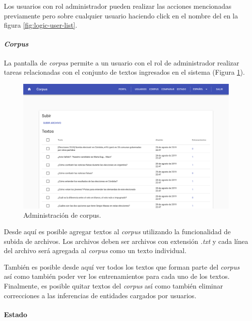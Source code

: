 \documentclass[12pt,a4paper,]{scrartcl}
\let\oldparagraph\paragraph
\renewcommand{\paragraph}[1]{\oldparagraph{#1}\mbox{}}
\begin{document}
Los usuarios con rol administrador pueden realizar las acciones mencionadas previamente pero sobre cualquier usuario haciendo click en el nombre del en la figura \ref{fig:logic-user-list}.

\hypertarget{corpus}{%
\paragraph{\texorpdfstring{\emph{Corpus}}{Corpus}}\label{corpus}}

La pantalla de \emph{corpus} permite a un usuario con el rol de administrador realizar tareas relacionadas con el conjunto de textos ingresados en el sistema (Figura \ref{fig:logic-corpus-management}).

\begin{figure}[H]

{\centering \includegraphics{assets/logic/corpus-management.pdf} 

}

\caption{Administración de corpus.}\label{fig:logic-corpus-management}
\end{figure}

Desde aquí es posible agregar textos al \emph{corpus} utilizando la funcionalidad de subida de archivos. Los archivos deben ser archivos con extensión \emph{.txt} y cada línea del archivo será agregada al \emph{corpus} como un texto individual.

También es posible desde aquí ver todos los textos que forman parte del \emph{corpus} así como también poder ver los entrenamientos para cada uno de los textos. Finalmente, es posible quitar textos del \emph{corpus} así como también eliminar correcciones a las inferencias de entidades cargados por usuarios.

\hypertarget{estado}{%
\paragraph{Estado}\label{estado}}
\end{document}
